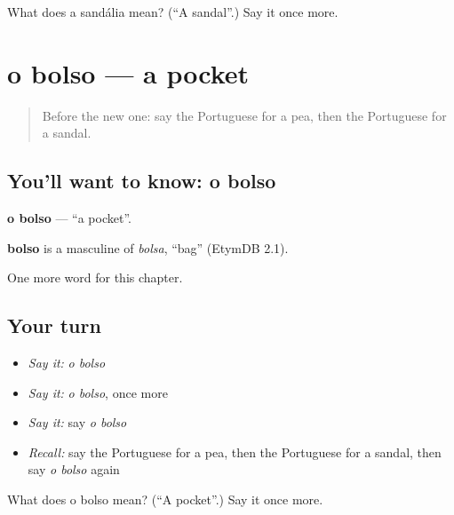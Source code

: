 \begin{tcolorbox}[breakable,colback=teal!4,colframe=teal!35!black,title={Before you move on}]
What does a sandália mean? (\textquotedblleft{}A sandal\textquotedblright{}.) Say it once more.
\end{tcolorbox}
\section[o bolso]{o bolso — a pocket}

\label{lesson:PT-C169-bolso}



\begin{quote}
Before the new one: say the Portuguese for a pea, then the Portuguese for a sandal.
\end{quote}

\subsection*{You'll want to know: o bolso}
\textbf{o bolso} — \textquotedblleft{}a pocket\textquotedblright{}.

\begin{cousinweb}
\textbf{bolso} is a masculine of \emph{bolsa}, \textquotedblleft{}bag\textquotedblright{} (EtymDB 2.1).
\end{cousinweb}

\begin{grammarlens}[title={What you've built}]
One more word for this chapter.
\end{grammarlens}

\subsection*{Your turn}
\begin{itemize}
\raggedright
  \item \emph{Say it:} \emph{o bolso}
  \item \emph{Say it:} \emph{o bolso}, once more
  \item \emph{Say it:} say \emph{o bolso}
  \item \emph{Recall:} say the Portuguese for a pea, then the Portuguese for a sandal, then say \emph{o bolso} again
\end{itemize}

\begin{tcolorbox}[breakable,colback=teal!4,colframe=teal!35!black,title={Before you move on}]
What does o bolso mean? (\textquotedblleft{}A pocket\textquotedblright{}.) Say it once more.
\end{tcolorbox}
